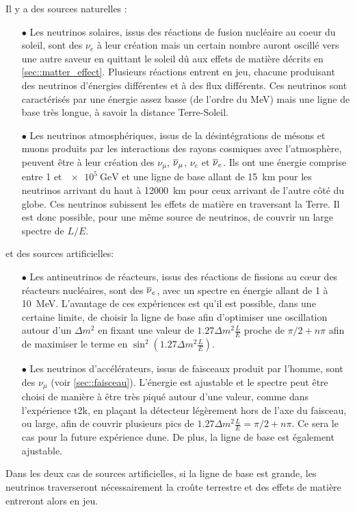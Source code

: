       Il y a des sources naturelles :
      \begin{itemize}
        \item[$\bullet$] Les neutrinos solaires, issus des réactions de fusion nucléaire au coeur du soleil, sont des $\nu_e$ à leur création mais un certain nombre auront oscillé vers une autre saveur en quittant le soleil dû aux effets de matière décrits en \autoref{sec::matter_effect}. Plusieurs réactions entrent en jeu, chacune produisant des neutrinos d'énergies différentes et à des flux différents. %
        Ces neutrinos sont caractérisés par une énergie assez basse (de l'ordre du \si{\mega\electronvolt}) mais une ligne de base très longue, à savoir la distance Terre-Soleil.
        \item[$\bullet$] Les neutrinos atmosphériques, issus de la désintégrations de mésons et muons produits par les interactions des rayons cosmiques avec l'atmosphère, peuvent être à leur création des $\nu_{\mu}$, $\overline{\nu}_{\mu}$, $\nu_e$ et $\overline{\nu}_e$. Ils ont une énergie comprise entre 1 et $\SI{e5}{\giga\electronvolt}$ et une ligne de base allant de \SI{15}{\kilo\meter} pour les neutrinos arrivant du haut à \SI{12000}{\kilo\meter} pour ceux arrivant de l'autre côté du globe. Ces neutrinos subissent les effets de matière en traversant la Terre. Il est donc possible, pour une même source de neutrinos, de couvrir un large spectre de $L/E$. %
      \end{itemize}

      et des sources artificielles:
      \begin{itemize}
        \item[$\bullet$] Les antineutrinos de réacteurs, issus des réactions de fissions au cœur des réacteurs nucléaires, sont des $\overline{\nu}_e$, avec un spectre en énergie allant de 1 à \SI{10}{\mega\electronvolt}.
        L'avantage de ces expériences est qu'il est possible, dans une certaine limite, de choisir la ligne de base afin d'optimiser une oscillation autour d'un $\Delta m^2$ en fixant une valeur de $1.27\Delta m^2\frac{L}{E}$ proche de $\pi/2+n\pi$ afin de maximiser le terme en $\sin^2(1.27\Delta m^2\frac{L}{E})$.
        \item[$\bullet$] Les neutrinos d'accélérateurs, issus de faisceaux produit par l'homme, sont des $\nu_{\mu}$ (voir \autoref{sec::faisceau}). L'énergie est ajustable et le spectre peut être choisi de manière à être très piqué autour d'une valeur, comme dans l'expérience \gls{t2k}, en plaçant la détecteur légèrement hors de l'axe du faisceau\cite{McDonald2001}, ou large, afin de couvrir plusieurs pics de $1.27\Delta m^2\frac{L}{E}=\pi/2+n\pi$. Ce sera le cas pour la future expérience \gls{dune}. De plus, la ligne de base est également ajustable.
      \end{itemize}
      Dans les deux cas de sources artificielles, si la ligne de base est grande, les neutrinos traverseront nécessairement la croûte terrestre et des effets de matière entreront alors en jeu.

